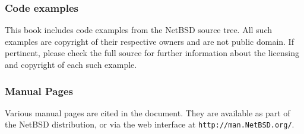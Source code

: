 \subsubsection*{Code examples}

This book includes code examples from the NetBSD source
tree.  All such examples are copyright of their respective owners
and are not public domain.  If pertinent, please check the full
source for further information about the licensing and copyright
of each such example.

\subsubsection{Manual Pages}

Various manual pages are cited in the document.  They are available
as part of the NetBSD distribution, or via the web interface
at \texttt{http://man.NetBSD.org/}.
